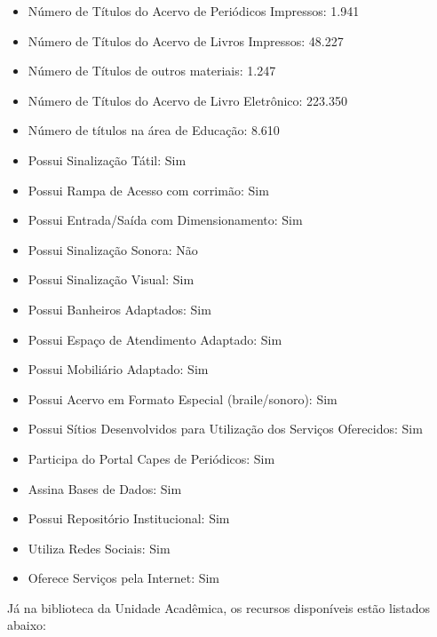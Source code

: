 \documentclass[
	12pt,				%
	openright,			%
  oneside,     %
	a4paper,			%
 hyphens,
	chapter=TITLE,		%
	english,			%
	french,				%
	spanish,			%
	brazil				%
	]{abntex2}
\begin{document}
\begin{itemize}
    \item Número de Títulos do Acervo de Periódicos Impressos: 1.941
    \item Número de Títulos do Acervo de Livros Impressos: 48.227
    \item Número de Títulos de outros materiais: 1.247
    \item Número de Títulos do Acervo de Livro Eletrônico: 223.350
    \item Número de títulos na área de Educação: 8.610
    \item Possui Sinalização Tátil: Sim
    \item Possui Rampa de Acesso com corrimão: Sim
    \item Possui Entrada/Saída com Dimensionamento: Sim
    \item Possui Sinalização Sonora: Não
    \item Possui Sinalização Visual: Sim
    \item Possui Banheiros Adaptados: Sim
    \item Possui Espaço de Atendimento Adaptado: Sim
    \item Possui Mobiliário Adaptado: Sim
    \item Possui Acervo em Formato Especial (braile/sonoro): Sim
    \item Possui Sítios Desenvolvidos para Utilização dos Serviços Oferecidos: Sim
    \item Participa do Portal Capes de Periódicos: Sim
    \item Assina Bases de Dados: Sim
    \item Possui Repositório Institucional: Sim
    \item Utiliza Redes Sociais: Sim
    \item Oferece Serviços pela Internet: Sim
\end{itemize}

Já na biblioteca da Unidade Acadêmica, os recursos disponíveis estão listados abaixo:
\end{document}

